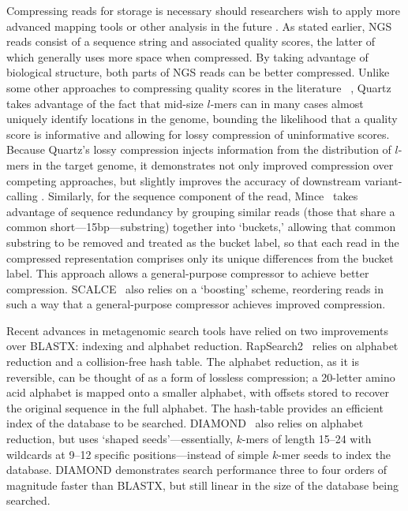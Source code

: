 \documentclass{acm_proc_article-sp}
\begin{document}
Compressing reads for storage is necessary should researchers wish to apply more advanced mapping tools or other analysis in the future \cite{bonfield2013compression}.
As stated earlier, NGS reads consist of a sequence string and associated quality scores, the latter of which generally uses more space when compressed.
By taking advantage of biological structure, both parts of NGS reads can be better compressed.
Unlike some other approaches to compressing quality scores in the literature
~\cite{bonfield2013compression,ochoa2013qualcomp},
Quartz~\cite{yu2015quality} takes advantage of the fact that mid-size $l$-mers can in many cases almost uniquely identify locations in the genome,
bounding the likelihood that a quality score is informative and allowing for lossy compression of uninformative scores.
Because Quartz's lossy compression injects information from the distribution of $l$-mers in the target genome, it demonstrates not only improved compression over competing approaches, but slightly improves the accuracy of downstream variant-calling \cite{yu2015quality}.
Similarly, for the sequence component of the read,
Mince~\cite{patro2015data} takes advantage of sequence redundancy by grouping
similar reads (those that share a common short---15bp---substring) together into `buckets,' allowing that common substring to be 
removed and treated as the bucket label, so that each read in the compressed 
representation comprises only its unique differences from the bucket label.
This approach allows a general-purpose compressor to achieve better compression.
SCALCE~\cite{berger2013computational} also relies on a `boosting' scheme, 
reordering
reads in such a way that a general-purpose compressor achieves improved
compression.

Recent advances in metagenomic search tools have relied on two improvements over
BLASTX: indexing and alphabet reduction.
RapSearch2~\cite{zhao2012rapsearch2} relies on alphabet reduction and a 
collision-free hash table.
The alphabet reduction, as it is reversible, can be thought of as a form of
lossless compression; a 20-letter amino acid alphabet is mapped onto a smaller
alphabet, with offsets stored to recover the original sequence in the full
alphabet.
The hash-table provides an efficient index of the database to be searched.
DIAMOND~\cite{buchfink2014fast} also relies on alphabet reduction, but uses
`shaped seeds'---essentially, $k$-mers of length 15--24 with wildcards at 9--12 specific positions---instead of simple $k$-mer seeds to index the database.
DIAMOND demonstrates search performance three to four orders of magnitude faster
than BLASTX, but still linear in the size of the database being searched.
\end{document}

